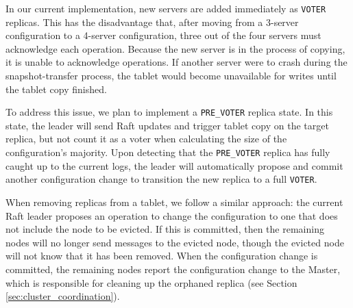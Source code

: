\documentclass[twocolumn,9pt]{article}
\begin{document}
In our current implementation, new servers are added immediately as {\tt VOTER} replicas.  This has
the disadvantage that, after moving from a 3-server configuration to a 4-server configuration, three
out of the four servers must acknowledge each operation. Because the new server is in the process of
copying, it is unable to acknowledge operations. If another server were to crash during the
snapshot-transfer process, the tablet would become unavailable for writes until the tablet copy
finished.

To address this issue, we plan to implement a {\tt PRE\_VOTER} replica state. In this
state, the leader will send Raft updates and trigger tablet copy on the
target replica, but not count it as a voter when calculating the size of the configuration's
majority. Upon detecting that the {\tt PRE\_VOTER} replica has fully caught up to
the current logs, the leader will automatically propose and commit another configuration change to
transition the new replica to a full {\tt VOTER}.

When removing replicas from a tablet, we follow a similar approach: the current Raft leader
proposes an operation to change the configuration to one that does not include the node
to be evicted. If this is committed, then the remaining nodes will no longer send messages
to the evicted node, though the evicted node will not know that it has been removed. When the
configuration change is committed, the remaining nodes report the configuration
change to the Master, which is responsible for cleaning up the orphaned replica (see
Section \ref{sec:cluster_coordination}).
\end{document}

